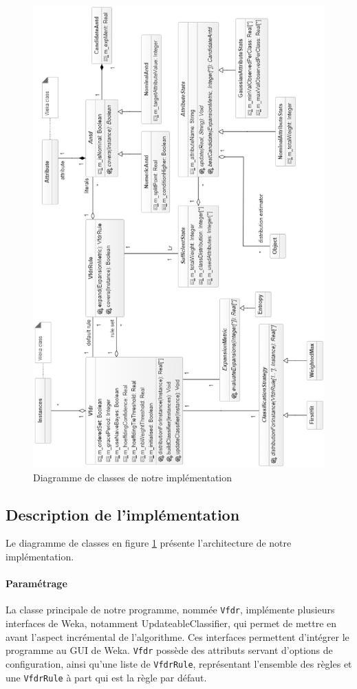    \begin{figure}
        \includegraphics[width=\textwidth]{src/image2}
        \caption{Diagramme de classes de notre implémentation}
        \label{fig:dclass}
    \end{figure}


    \subsection{Description de l'implémentation}

        Le diagramme de classes en figure \ref{fig:dclass} présente l'architecture de notre implémentation.

        \paragraph{Paramétrage} La classe principale de notre programme, nommée \texttt{Vfdr}, implémente plusieurs interfaces de Weka, notamment UpdateableClassifier, qui permet de mettre en avant l’aspect incrémental de l’algorithme. Ces interfaces permettent d'intégrer le programme au GUI de Weka. \texttt{Vfdr} possède des attributs servant d’options de configuration, ainsi qu’une liste de \texttt{VfdrRule}, représentant l’ensemble des règles et une \texttt{VfdrRule} à part qui est la règle par défaut.

